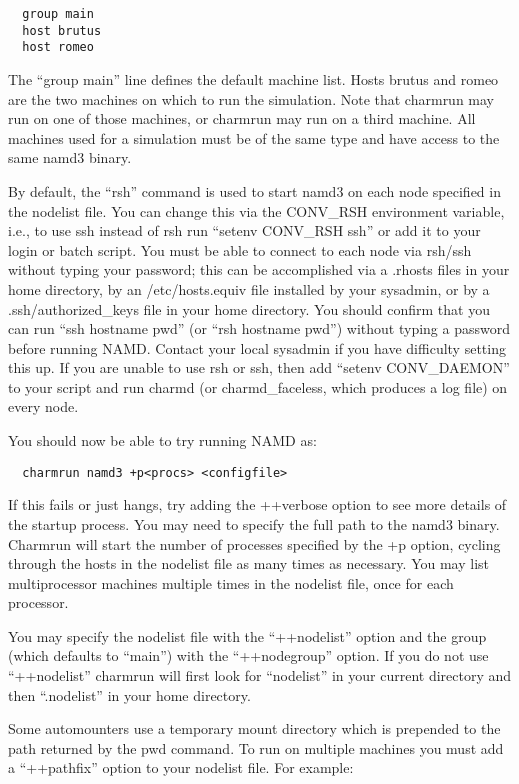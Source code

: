 \begin{verbatim}
  group main
  host brutus
  host romeo
\end{verbatim}

The ``group main'' line defines the default machine list.  Hosts brutus
and romeo are the two machines on which to run the simulation.  Note
that charmrun may run on one of those machines, or charmrun may run
on a third machine.  All machines used for a simulation must be of the
same type and have access to the same namd3 binary.

By default, the ``rsh'' command is used to start namd3
on each node specified in the nodelist file.  You can change this via
the CONV\_RSH environment variable, i.e., to use ssh instead of rsh run
``setenv CONV\_RSH ssh'' or add it to your login or batch script.  You
must be able to connect to each node via rsh/ssh without typing your
password; this can be accomplished via a .rhosts files in your home
directory, by an /etc/hosts.equiv file installed by your sysadmin, or
by a .ssh/authorized\_keys file in your home directory.  You should
confirm that you can run ``ssh hostname pwd'' (or ``rsh hostname pwd'')
without typing a password before running NAMD.  Contact your local
sysadmin if you have difficulty setting this up.  If you are unable to
use rsh or ssh, then add ``setenv CONV\_DAEMON'' to your script and run 
charmd (or charmd\_faceless, which produces a log file) on every node.

You should now be able to try running NAMD as:

\begin{verbatim}
  charmrun namd3 +p<procs> <configfile>
\end{verbatim}

If this fails or just hangs, try adding the ++verbose option to see
more details of the startup process.  You may need to specify the full
path to the namd3 binary.  Charmrun will start the number of processes
specified by the +p option, cycling through the hosts in the nodelist
file as many times as necessary.  You may list multiprocessor machines
multiple times in the nodelist file, once for each processor.

You may specify the nodelist file with the ``++nodelist'' option and the
group (which defaults to ``main'') with the ``++nodegroup'' option.  If
you do not use ``++nodelist'' charmrun will first look for ``nodelist''
in your current directory and then ``.nodelist'' in your home directory.

Some automounters use a temporary mount directory which is prepended
to the path returned by the pwd command.  To run on multiple machines
you must add a ``++pathfix'' option to your nodelist file.  For example:

